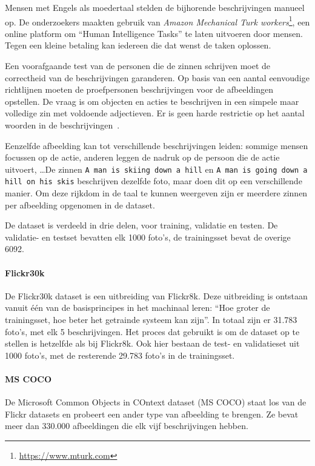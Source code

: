 Mensen met Engels als moedertaal stelden de bijhorende beschrijvingen manueel op. De onderzoekers maakten gebruik van \emph{Amazon Mechanical Turk workers}\footnote{\url{https://www.mturk.com}}, een online platform om ``Human Intelligence Tasks'' te laten uitvoeren door mensen. Tegen een kleine betaling kan iedereen die dat wenst de taken oplossen. 

Een voorafgaande test van de personen die de zinnen schrijven moet de correctheid van de beschrijvingen garanderen. Op basis van een aantal eenvoudige richtlijnen moeten de proefpersonen beschrijvingen voor de afbeeldingen opstellen. De vraag is om objecten en acties te beschrijven in een simpele maar volledige zin met voldoende adjectieven. Er is geen harde restrictie op het aantal woorden in de beschrijvingen~\cite{Hockenmaier2014}.

Eenzelfde afbeelding kan tot verschillende beschrijvingen leiden: sommige mensen focussen op de actie, anderen leggen de nadruk op de persoon die de actie uitvoert, \ldots  De zinnen \texttt{A man is skiing down a hill} en \texttt{A man is going down a hill on his skis} beschrijven dezelfde foto, maar doen dit op een verschillende manier. Om deze rijkdom in de taal te kunnen weergeven zijn er meerdere zinnen per afbeelding opgenomen in de dataset.

De dataset is verdeeld in drie delen, voor training, validatie en testen. De validatie- en testset bevatten elk 1000 foto's, de trainingsset bevat de overige 6092.


\paragraph{Flickr30k}
\label{par:Flickr30k}
De Flickr30k dataset\cite{Young2014} is een uitbreiding van Flickr8k. Deze uitbreiding is ontstaan vanuit \'e\'en van de basisprincipes in het machinaal leren: ``Hoe groter de trainingsset, hoe beter het getrainde systeem kan zijn''. In totaal zijn er 31.783 foto's, met elk 5 beschrijvingen. Het proces dat gebruikt is om de dataset op te stellen is hetzelfde als bij Flickr8k. Ook hier bestaan de test- en validatieset uit 1000 foto's, met de resterende 29.783 foto's in de trainingsset.


\paragraph{MS COCO}
\label{par:MS COCO}
De Microsoft Common Objects in COntext dataset (MS COCO)\cite{Lin2014} staat los van de Flickr datasets en probeert een ander type van afbeelding te brengen. Ze bevat meer dan 330.000 afbeeldingen die elk vijf beschrijvingen hebben. 

